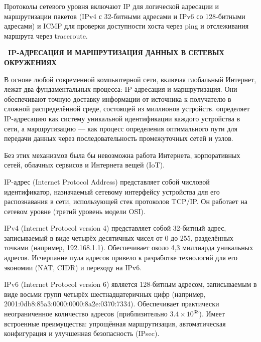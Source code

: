 \documentclass{SibFU-docs}
\begin{document}
Протоколы сетевого уровня включают IP для логической адресации и маршрутизации пакетов (IPv4 с 32-битными адресами и IPv6 со 128-битными адресами) и ICMP для проверки доступности хоста через ping и отслеживания маршрута через traceroute.

\newpage
{}
\begin{center}\textbf{\thesection\ IP-АДРЕСАЦИЯ И МАРШРУТИЗАЦИЯ ДАННЫХ В СЕТЕВЫХ ОКРУЖЕНИЯХ}\end{center}
\vspace*{-1.5em}

В основе любой современной компьютерной сети, включая глобальный Интернет, лежат два фундаментальных процесса: IP-адресация и маршрутизация. Они обеспечивают точную доставку информации от источника к получателю в сложной распределённой среде, состоящей из миллионов устройств. \cite{comer2018internetworking} определяет IP-адресацию как систему уникальной идентификации каждого устройства в сети, а маршрутизацию --- как процесс определения оптимального пути для передачи данных через последовательность промежуточных сетей и узлов.

Без этих механизмов была бы невозможна работа Интернета, корпоративных сетей, облачных сервисов и Интернета вещей (IoT).


IP-адрес (Internet Protocol Address) представляет собой числовой идентификатор, назначаемый сетевому интерфейсу устройства для его распознавания в сети, использующей стек протоколов TCP/IP. Он работает на сетевом уровне (третий уровень модели OSI).


IPv4 (Internet Protocol version 4) представляет собой 32-битный адрес, записываемый в виде четырёх десятичных чисел от 0 до 255, разделённых точками (например, 192.168.1.1). Обеспечивает около 4,3 миллиарда уникальных адресов. Исчерпание пула адресов привело к разработке технологий для его экономии (NAT, CIDR) и переходу на IPv6.

IPv6 (Internet Protocol version 6) является 128-битным адресом, записываемым в виде восьми групп четырёх шестнадцатеричных цифр (например, 2001:0db8:85a3:0000:0000:8a2e:0370:7334). Обеспечивает практически неограниченное количество адресов (приблизительно \(3.4 \times 10^{38}\)). Имеет встроенные преимущества: упрощённая маршрутизация, автоматическая конфигурация и улучшенная безопасность (IPsec).
\end{document}
